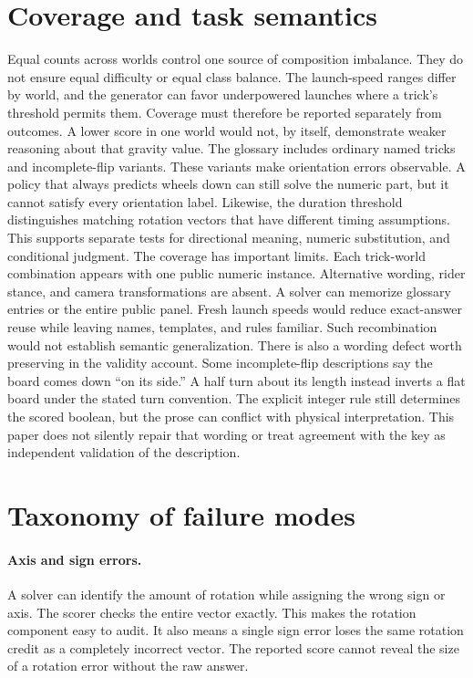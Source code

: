 \documentclass{article}
\begin{document}
\section{Coverage and task semantics}

\begin{table}[ht]\centering\caption{Complete public-panel inventory. Feasible and wheels-down counts can overlap.}\end{table}
Equal counts across worlds control one source of composition imbalance. They do not ensure equal difficulty or equal class balance. The launch-speed ranges differ by world, and the generator can favor underpowered launches where a trick's threshold permits them. Coverage must therefore be reported separately from outcomes. A lower score in one world would not, by itself, demonstrate weaker reasoning about that gravity value.
The glossary includes ordinary named tricks and incomplete-flip variants. These variants make orientation errors observable. A policy that always predicts wheels down can still solve the numeric part, but it cannot satisfy every orientation label. Likewise, the duration threshold distinguishes matching rotation vectors that have different timing assumptions. This supports separate tests for directional meaning, numeric substitution, and conditional judgment.
The coverage has important limits. Each trick-world combination appears with one public numeric instance. Alternative wording, rider stance, and camera transformations are absent. A solver can memorize glossary entries or the entire public panel. Fresh launch speeds would reduce exact-answer reuse while leaving names, templates, and rules familiar. Such recombination would not establish semantic generalization.
There is also a wording defect worth preserving in the validity account. Some incomplete-flip descriptions say the board comes down ``on its side.'' A half turn about its length instead inverts a flat board under the stated turn convention. The explicit integer rule still determines the scored boolean, but the prose can conflict with physical interpretation. This paper does not silently repair that wording or treat agreement with the key as independent validation of the description.
\section{Taxonomy of failure modes}
\paragraph{Axis and sign errors.} A solver can identify the amount of rotation while assigning the wrong sign or axis. The scorer checks the entire vector exactly. This makes the rotation component easy to audit. It also means a single sign error loses the same rotation credit as a completely incorrect vector. The reported score cannot reveal the size of a rotation error without the raw answer.
\end{document}
